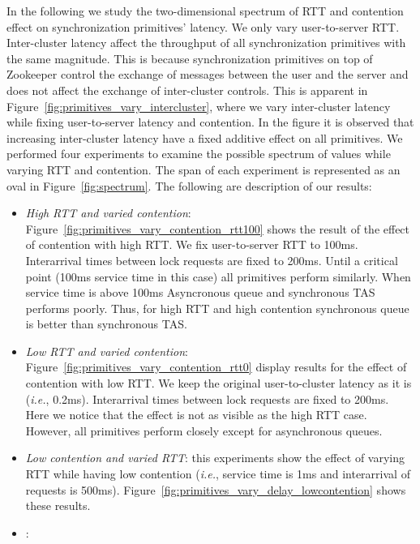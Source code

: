 In the following we study the two-dimensional spectrum of RTT and contention effect on synchronization primitives' latency. We only vary user-to-server RTT. Inter-cluster latency affect the throughput of all synchronization primitives with the same magnitude. This is because synchronization primitives on top of Zookeeper control the exchange of messages between the user and the server and does not affect the exchange of inter-cluster controls. This is apparent in Figure~\ref{fig:primitives_vary_intercluster}, where we vary inter-cluster latency while fixing user-to-server latency and contention. In the figure it is observed that increasing inter-cluster latency have a fixed additive effect on all primitives. We performed four experiments to examine the possible spectrum of values while varying RTT and contention. The span of each experiment is represented as an oval in Figure~\ref{fig:spectrum}. The following are description of our results:
\begin{itemize}
\item{\emph{High RTT and varied contention}: Figure~\ref{fig:primitives_vary_contention_rtt100} shows the result of the effect of contention with high RTT. We fix user-to-server RTT to 100ms. Interarrival times between lock requests are fixed to 200ms. Until a critical point (100ms service time in this case) all primitives perform similarly. When service time is above 100ms Asyncronous queue and synchronous TAS performs poorly. Thus, for high RTT and high contention synchronous queue is better than synchronous TAS.}
\item{\emph{Low RTT and varied contention}: Figure~\ref{fig:primitives_vary_contention_rtt0} display results for the effect of contention with low RTT. We keep the original user-to-cluster latency as it is (\emph{i.e.}, 0.2ms). Interarrival times between lock requests are fixed to 200ms. Here we notice that the effect is not as visible as the high RTT case. However, all primitives perform closely except for asynchronous queues.}
\item{\emph{Low contention and varied RTT}: this experiments show the effect of varying RTT while having low contention (\emph{i.e.}, service time is 1ms and interarrival of requests is 500ms). Figure~\ref{fig:primitives_vary_delay_lowcontention} shows these results.  }
\item{\emph{ }: }
\end{itemize}















